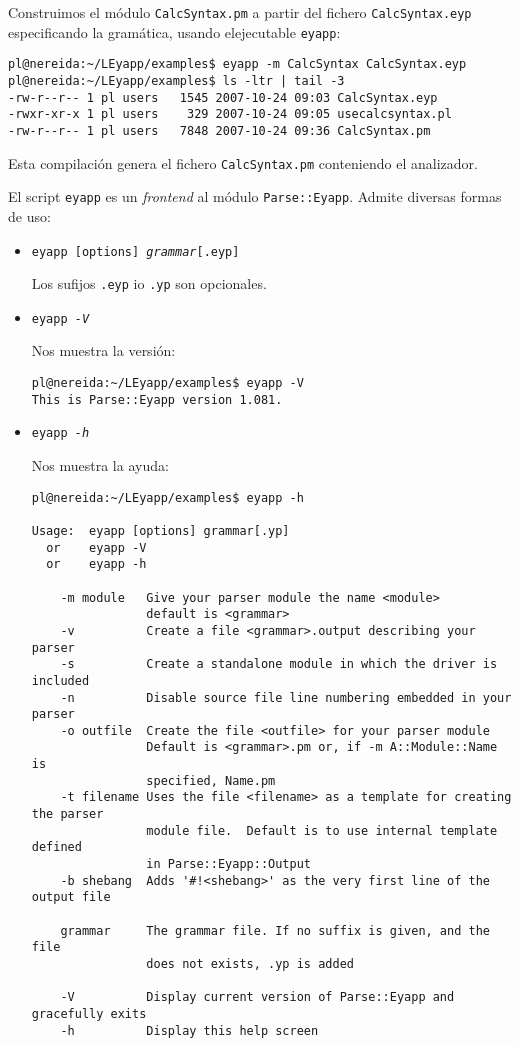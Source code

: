 Construimos el módulo \verb|CalcSyntax.pm| a partir del fichero \verb|CalcSyntax.eyp|
especificando la gramática, usando elejecutable \verb|eyapp|:
\begin{verbatim}
pl@nereida:~/LEyapp/examples$ eyapp -m CalcSyntax CalcSyntax.eyp
pl@nereida:~/LEyapp/examples$ ls -ltr | tail -3
-rw-r--r-- 1 pl users   1545 2007-10-24 09:03 CalcSyntax.eyp
-rwxr-xr-x 1 pl users    329 2007-10-24 09:05 usecalcsyntax.pl
-rw-r--r-- 1 pl users   7848 2007-10-24 09:36 CalcSyntax.pm
\end{verbatim}
Esta compilación genera el fichero \verb|CalcSyntax.pm| conteniendo el
analizador.

El script \verb|eyapp| es un \emph{frontend} al módulo \verb|Parse::Eyapp|.
Admite diversas formas de uso:

\begin{itemize}
\item
{\tt eyapp [options] \textit{grammar}[.eyp]}

Los sufijos {\tt .eyp} io {\tt .yp} son opcionales.
\item
{\tt eyapp \textit{-V}}

Nos muestra la versión:
\begin{verbatim}
pl@nereida:~/LEyapp/examples$ eyapp -V
This is Parse::Eyapp version 1.081.
\end{verbatim}

\item
{\tt eyapp \textit{-h}}

Nos muestra la ayuda:

\begin{verbatim}
pl@nereida:~/LEyapp/examples$ eyapp -h

Usage:  eyapp [options] grammar[.yp]
  or    eyapp -V
  or    eyapp -h

    -m module   Give your parser module the name <module>
                default is <grammar>
    -v          Create a file <grammar>.output describing your parser
    -s          Create a standalone module in which the driver is included
    -n          Disable source file line numbering embedded in your parser
    -o outfile  Create the file <outfile> for your parser module
                Default is <grammar>.pm or, if -m A::Module::Name is
                specified, Name.pm
    -t filename Uses the file <filename> as a template for creating the parser
                module file.  Default is to use internal template defined
                in Parse::Eyapp::Output
    -b shebang  Adds '#!<shebang>' as the very first line of the output file

    grammar     The grammar file. If no suffix is given, and the file
                does not exists, .yp is added

    -V          Display current version of Parse::Eyapp and gracefully exits
    -h          Display this help screen
\end{verbatim}

\end{itemize}

